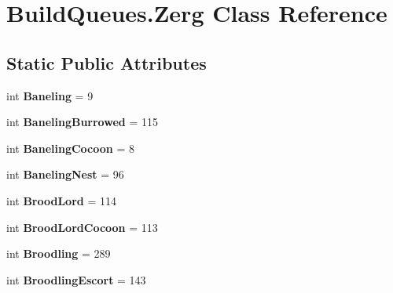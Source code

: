 \hypertarget{classBuildQueues_1_1Zerg}{}\section{Build\+Queues.\+Zerg Class Reference}
\label{classBuildQueues_1_1Zerg}
\subsection*{Static Public Attributes}
\begin{DoxyCompactItemize}
\item 
int {\bfseries Baneling} = 9\hypertarget{classBuildQueues_1_1Zerg_a50a80534ca3dd097ba6d4b81437dde9a}{}\label{classBuildQueues_1_1Zerg_a50a80534ca3dd097ba6d4b81437dde9a}

\item 
int {\bfseries Baneling\+Burrowed} = 115\hypertarget{classBuildQueues_1_1Zerg_a2d4dfd042a8144ffc6fa9e783f636619}{}\label{classBuildQueues_1_1Zerg_a2d4dfd042a8144ffc6fa9e783f636619}

\item 
int {\bfseries Baneling\+Cocoon} = 8\hypertarget{classBuildQueues_1_1Zerg_a73737c2c372b27db93425511d1defc2f}{}\label{classBuildQueues_1_1Zerg_a73737c2c372b27db93425511d1defc2f}

\item 
int {\bfseries Baneling\+Nest} = 96\hypertarget{classBuildQueues_1_1Zerg_af64a3e988ac23224b101ae3f8044cbd1}{}\label{classBuildQueues_1_1Zerg_af64a3e988ac23224b101ae3f8044cbd1}

\item 
int {\bfseries Brood\+Lord} = 114\hypertarget{classBuildQueues_1_1Zerg_aee0c7e803911ef7b40f941b1d4806b62}{}\label{classBuildQueues_1_1Zerg_aee0c7e803911ef7b40f941b1d4806b62}

\item 
int {\bfseries Brood\+Lord\+Cocoon} = 113\hypertarget{classBuildQueues_1_1Zerg_ae0b2863527f9b8bfbb8e8834b17e9c7b}{}\label{classBuildQueues_1_1Zerg_ae0b2863527f9b8bfbb8e8834b17e9c7b}

\item 
int {\bfseries Broodling} = 289\hypertarget{classBuildQueues_1_1Zerg_a6ac60cbbede7c799824b979f703357c5}{}\label{classBuildQueues_1_1Zerg_a6ac60cbbede7c799824b979f703357c5}

\item 
int {\bfseries Broodling\+Escort} = 143\hypertarget{classBuildQueues_1_1Zerg_a2b71fd77fe276d4b30ed53aa4ffd6b8e}{}\label{classBuildQueues_1_1Zerg_a2b71fd77fe276d4b30ed53aa4ffd6b8e}


\end{DoxyCompactItemize}
